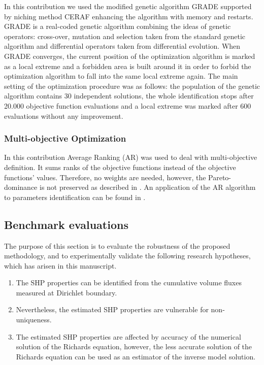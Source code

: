 \documentclass[review,times,3p,twocolumn,10pt]{elsarticle}
\begin{document}
In this contribution we used the modified genetic algorithm GRADE \citep{grade,Kucerova:2007:PHD} supported by niching method CERAF \citep{Hrstka} enhancing the algorithm with
memory and restarts. GRADE is a real-coded genetic algorithm combining the ideas of genetic operators: cross-over, mutation and selection taken from the standard genetic algorithm and differential operators taken from differential evolution. When GRADE converges, the current position of the optimization algorithm is marked as a local extreme and a forbidden area is built around it in order to forbid the optimization algorithm to fall into the same local extreme again. The main setting of the optimization procedure was as follows: the population of the genetic algorithm contains 30 independent solutions, the whole identification stops after 20.000 objective function evaluations and a local extreme was marked after 600 evaluations without any improvement.


\subsubsection{Multi-objective Optimization}

 In this contribution Average Ranking (AR) \citep{Leps:2007} was used to deal with multi-objective definition. It sums ranks of the objective functions instead of the objective functions' values. Therefore, no weights are needed, however, the Pareto-dominance is not preserved as described in \cite{vitingerova:2010}. An application of the AR algorithm to parameters identification can be found in \cite{Kuraz:2010:JCAM}. 
 
 \subsection{Benchmark evaluations}
 \label{benchmarks}
 
The purpose of this section is to evaluate the robustness of the proposed methodology, and to experimentally validate the following  research hypotheses, which has arisen   in this manuscript.
\begin{enumerate}
\item The SHP properties can be identified from the cumulative volume fluxes measured at Dirichlet boundary. 
\item Nevertheless, the estimated SHP properties are vulnerable for non-uniqueness.
\item The estimated SHP properties are affected by accuracy of the numerical solution of the Richards equation, however, the less accurate solution of the Richards equation can be used as an estimator of the inverse model solution.
\end{enumerate}
\end{document}
